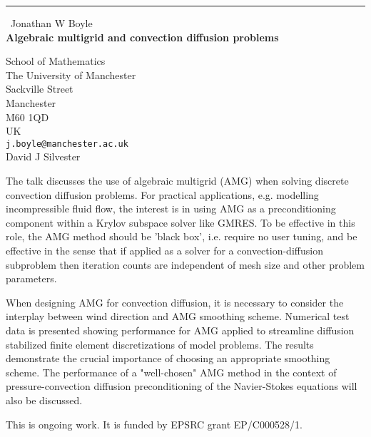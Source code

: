 \documentclass{report}
\begin{document}
\begin{center}
\rule{6in}{1pt} \
{\large Jonathan W Boyle \\
{\bf Algebraic multigrid and convection diffusion problems}}

School of Mathematics \\ The University of Manchester \\ Sackville Street \\ Manchester \\ M60 1QD \\ UK
\\
{\tt j.boyle@manchester.ac.uk}\\
David J Silvester\end{center}

The talk discusses the use of algebraic multigrid (AMG) when solving
discrete convection diffusion problems. For practical applications, e.g.
modelling incompressible fluid flow, the interest is in using AMG as a
preconditioning component within a Krylov subspace solver like GMRES. To
be effective in this role, the AMG method should be 'black box', i.e.
require no user tuning, and be effective in the sense that if applied as
a solver for a convection-diffusion subproblem then iteration counts are
independent of mesh size and other problem parameters.

When designing AMG for convection diffusion, it is necessary to consider
the interplay between wind direction and AMG smoothing scheme. Numerical
test data is presented showing performance for AMG applied to streamline
diffusion stabilized finite element discretizations of model problems.
The results demonstrate the crucial importance of choosing an appropriate
smoothing
scheme. The performance of a "well-chosen" AMG method in the context of
pressure-convection diffusion preconditioning of the Navier-Stokes
equations will also be discussed.

This is ongoing work. It is funded by EPSRC grant EP/C000528/1.
\end{document}
